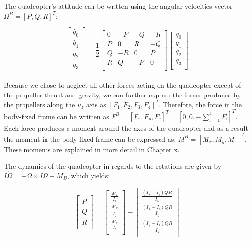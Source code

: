 The quadcopter's attitude can be written using the angular velocities vector $\Omega^{B}=[P, Q, R]^{T}$:

\begin{equation}
\label{S7}
 \begin{bmatrix}
 	\dot{q_{0}} \\
 	\dot{q_{1}}\\
 	\dot{q_{2}} \\
 	\dot{q_{3}} \\
 	\end{bmatrix}=\frac{1}{2}\begin{bmatrix}
 	0 & -P & -Q & -R \\
 	P & 0 & R & -Q \\
 	Q & -R & 0 & P \\
 	R & Q & -P & 0 \\
 	\end{bmatrix}\begin{bmatrix}
 	q_{0} \\
 	q_{1}\\
 	q_{2} \\
 	q_{3} \\
\end{bmatrix}
\end{equation}

Because we chose to neglect all other forces acting on the quadcopter except of the propeller thrust and gravity, we can further express the forces produced by the propellers along the $u_{z}$ axis as $[F_{1}, F_{2}, F_{3}, F_{4}]^{T}$. Therefore, the force in the body-fixed frame can be written as $F^{B}=[F_{x}, F_{y}, F_{z}]^{T}=[0, 0, -\sum\limits_{i=1}^4 F_{i}]^{T}$. Each force produces a moment around the axes of the quadcopter and as a result the moment in the body-fixed frame can be expressed as: $M^{B}=[M_{x}, M_{y}, M_{z}]^{T}$. These moments are explained in more detail in Chapter x.

The dynamics of the quadcopter in regards to the rotations are given by $I\dot{\Omega}=-\Omega\times I \Omega+M_{B}$, which yields:

\begin{equation}
\label{S8}
 \begin{bmatrix}
 	\dot{P} \\
 	\dot{Q} \\
 	\dot{R} \\
 	\end{bmatrix}=\begin{bmatrix}
 	\frac{M_{x}}{I_{x}}  \\
 	\frac{M_{y}}{I_{y}}  \\
 	\frac{M_{z}}{I_{z}}  \\
 	\end{bmatrix}-\begin{bmatrix}
 	\frac{(I_{z}-I_{y})QR}{I_{x}} \\
 	\frac{(I_{x}-I_{z})QR}{I_{y}} \\
 	\frac{(I_{y}-I_{x})QR}{I_{z}} \\
\end{bmatrix}
\end{equation}
 	 
